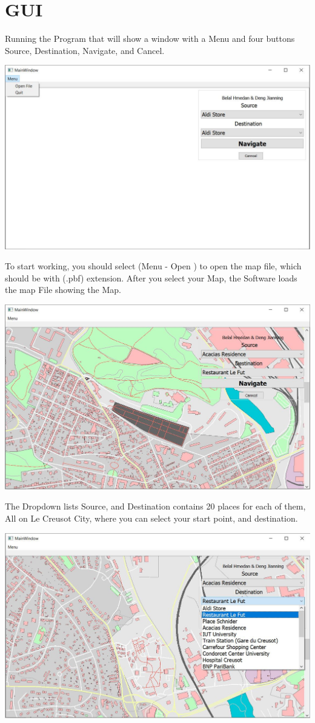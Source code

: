 \documentclass[a4paper,english]{book}
\begin{document}
\section{GUI}
Running the Program that will show a window with a Menu and four buttons Source, Destination, Navigate, and Cancel.
\begin{center}
\includegraphics[width=.6\textwidth]{GUI_NoMap.JPG}
\end{center}
To start working, you should select (Menu - Open )
to open the map file, which should be with (.pbf) extension.
After you select your Map, the Software loads the map File showing the Map.
\begin{center}
\includegraphics[width=.6\textwidth]{GUI_Map0.JPG}
\end{center}
The Dropdown lists Source, and Destination contains 20 places for each of them, All on Le Creusot City, where you can select your start point, and destination.
\begin{center}
\includegraphics[width=.6\textwidth]{GUI_Map1.JPG}
\end{center}
\end{document}
